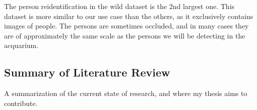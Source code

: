 The person reidentification in the wild dataset is the 2nd largest one. This dataset is more similar to our use case than the others, as it exclusively contains images of people. The persons are sometimes occluded, and in many cases they are of approximately the same scale as the persons we will be detecting in the acquarium. 




\subsection{Summary of Literature Review}
A summarization of the current state of research, and where my thesis aims to contribute.
